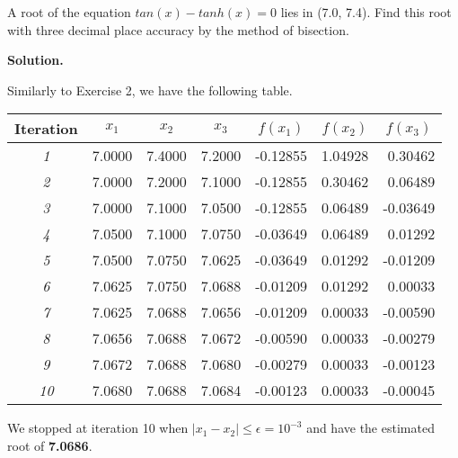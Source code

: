 \begin{exercise}{5} %
A root of the equation $tan(x)-tanh(x)=0$ lies in (7.0, 7.4). Find this root with three
decimal place accuracy by the method of bisection.

\textbf{Solution.} 

Similarly to Exercise 2, we have the following table.

\begin{table}[H]
\centering
\begin{tabular}{|c|r|r|r|r|r|r|}
\hline
\textbf{Iteration} & \multicolumn{1}{c|}{\textbf{\(x_1\)}} & \multicolumn{1}{c|}{\textbf{\(x_2\)}} & \multicolumn{1}{c|}{\textbf{\(x_3\)}} & \multicolumn{1}{c|}{\textbf{\(f(x_1)\)}} & \multicolumn{1}{c|}{\textbf{\(f(x_2)\)}} & \multicolumn{1}{c|}{\textbf{\(f(x_3)\)}} \\ \hline
\textit{1} & 7.0000 & 7.4000 & 7.2000 & -0.12855 & 1.04928 & 0.30462 \\ \hline
\textit{2} & 7.0000 & 7.2000 & 7.1000 & -0.12855 & 0.30462 & 0.06489 \\ \hline
\textit{3} & 7.0000 & 7.1000 & 7.0500 & -0.12855 & 0.06489 & -0.03649 \\ \hline
\textit{4} & 7.0500 & 7.1000 & 7.0750 & -0.03649 & 0.06489 & 0.01292 \\ \hline
\textit{5} & 7.0500 & 7.0750 & 7.0625 & -0.03649 & 0.01292 & -0.01209 \\ \hline
\textit{6} & 7.0625 & 7.0750 & 7.0688 & -0.01209 & 0.01292 & 0.00033 \\ \hline
\textit{7} & 7.0625 & 7.0688 & 7.0656 & -0.01209 & 0.00033 & -0.00590 \\ \hline
\textit{8} & 7.0656 & 7.0688 & 7.0672 & -0.00590 & 0.00033 & -0.00279 \\ \hline
\textit{9} & 7.0672 & 7.0688 & 7.0680 & -0.00279 & 0.00033 & -0.00123 \\ \hline
\textit{10} & 7.0680 & 7.0688 & 7.0684 & -0.00123 & 0.00033 & -0.00045 \\ \hline
\end{tabular}
\end{table}

We stopped at iteration 10 when \(|x_1-x_2| \leq \epsilon = 10^{-3}\) and have the estimated root of \textbf{7.0686}.

\end{exercise}


 
